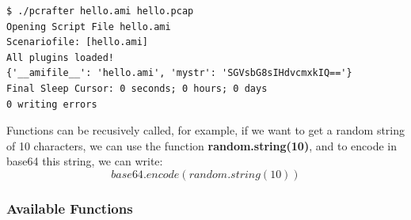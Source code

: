 \documentclass[10pt]{article}
\begin{document}
\begin{lstlisting}[caption={Seeing our encoded string},captionpos=b]
$ ./pcrafter hello.ami hello.pcap
Opening Script File hello.ami
Scenariofile: [hello.ami]
All plugins loaded!
{'__amifile__': 'hello.ami', 'mystr': 'SGVsbG8sIHdvcmxkIQ=='}
Final Sleep Cursor: 0 seconds; 0 hours; 0 days
0 writing errors
\end{lstlisting}

Functions can be recusively called, for example, if we want to get a random string of 10 characters, we can use the function \textbf{random.string(10)}, and to encode in base64 this string, we can write:
\begin{equation}
  \boxed{base64.encode(random.string(10))}
\end{equation}

\subsubsection{Available Functions}
\end{document}
